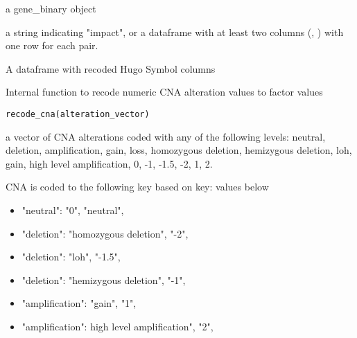 \documentclass[a4paper]{book}
\begin{document}
%
\begin{Arguments}
\begin{ldescription}
\item[\code{genomic\_df}] a gene\_binary object

\item[\code{alias\_table}] a string indicating "impact", or a  dataframe with at least two columns (,
) with one row for each pair.
\end{ldescription}
\end{Arguments}
%
\begin{Value}
A dataframe with recoded Hugo Symbol columns
\end{Value}
%
\begin{Examples}
\end{Examples}
%
\begin{Description}\relax
Internal function to recode numeric CNA alteration values to factor values
\end{Description}
%
\begin{Usage}
\begin{verbatim}
recode_cna(alteration_vector)
\end{verbatim}
\end{Usage}
%
\begin{Arguments}
\begin{ldescription}
\item[\code{alteration\_vector}] a vector of CNA alterations coded with any of the
following levels: neutral, deletion, amplification, gain, loss, homozygous deletion,
hemizygous deletion, loh, gain, high level amplification, 0, -1, -1.5, -2, 1, 2.
\end{ldescription}
\end{Arguments}
%
\begin{Details}\relax
CNA is coded to the following key based on key: values below
\begin{itemize}

\item{} "neutral":  "0", "neutral",
\item{} "deletion": "homozygous deletion", "-2",
\item{} "deletion": "loh", "-1.5",
\item{} "deletion": "hemizygous deletion", "-1",
\item{} "amplification": "gain", "1",
\item{} "amplification": high level amplification", "2",

\end{itemize}

\end{Details}
\end{document}
